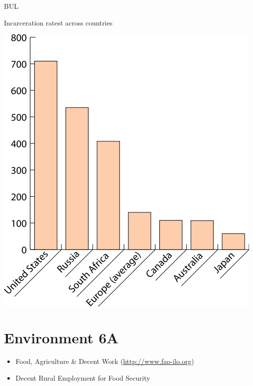 \lipsum[1-2]

\begin{chart}{B}{UL}
\caption{Incarceration ratest across countries}
\label{chart:incarceration}
\includegraphics[width=\chartwidth,height=\chartheight]{incarceration}  
\end{chart}



\section{Environment 6A}

\lipsum[1-4]

\begin{freading}
  \begin{itemize}
  \item Food, Agriculture \& Decent Work (\url{http://www.fao-ilo.org})
  \item Decent Rural Employment for  Food Security 
  \end{itemize}
\end{freading}

